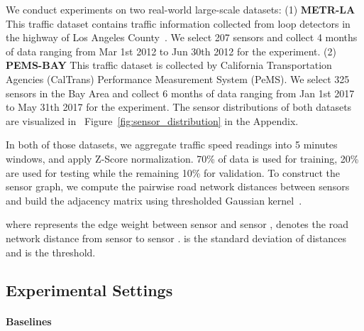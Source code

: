 We conduct experiments on two real-world large-scale datasets: (1) \textbf{METR-LA} This traffic dataset contains traffic information collected from loop detectors in the highway of Los Angeles County~\citep{Jagadish2014}.  We select 207 sensors and collect 4 months of data ranging from Mar 1st 2012 to Jun 30th 2012 for the experiment.
(2) \textbf{PEMS-BAY} This traffic dataset is collected by California Transportation Agencies (CalTrans) Performance Measurement System (PeMS). 
We select 325 sensors in the Bay Area and collect 6 months of data ranging from Jan 1st 2017 to May 31th 2017 for the experiment.
The sensor distributions of both datasets are visualized in~ Figure~\ref{fig:sensor_distribution} in the Appendix. 

In both of those datasets, we aggregate traffic speed readings into 5 minutes windows, and apply Z-Score normalization. 70\% of data is used for training, 20\% are used for testing while the remaining 10\% for validation. 
To construct the sensor graph, we compute the pairwise road network distances between sensors and build the adjacency matrix using thresholded Gaussian kernel~\citep{shuman2013emerging}. 

where  represents the edge weight between sensor  and sensor ,  denotes the road network distance from sensor  to sensor .  is the standard deviation of distances and  is the threshold.
\vspace{-0.15in}
\subsection{Experimental Settings}
\vspace{-0.1in}
\paragraph{Baselines}

